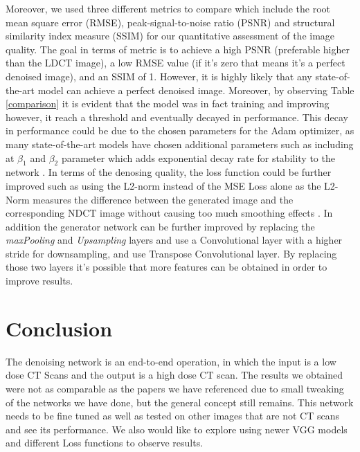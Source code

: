 \documentclass[journal]{IEEEtran}
\begin{document}
Moreover, we used three different metrics to compare which include the root mean square error (RMSE), peak-signal-to-noise ratio (PSNR) and structural similarity index measure (SSIM) for our quantitative assessment of the image quality.  The goal in terms of metric is to achieve a high PSNR (preferable higher than the LDCT image), a low RMSE value (if it's zero that means it's a perfect denoised image), and an SSIM of 1.  However, it is highly likely that any state-of-the-art model can achieve a perfect denoised image.  Moreover, by observing Table \ref{comparison} it is evident that the model was in fact training and improving however, it reach a threshold and eventually decayed in performance.  This decay in performance could be due to the chosen parameters for the Adam optimizer, as many state-of-the-art models have chosen additional parameters such as including at $\beta_1$ and $\beta_2$ parameter which adds exponential decay rate for stability to the network \cite{radford2015unsupervised}.  In terms of the denosing quality, the loss function could be further improved such as using the L2-norm instead of the MSE Loss alone as the L2-Norm measures the difference between the generated image and the corresponding NDCT image without causing too much smoothing effects \cite{yin2021unpaired}.  In addition the generator network can be further improved by replacing the \emph{maxPooling} and \emph{Upsampling} layers and use a Convolutional layer with a higher stride for downsampling, and use Transpose Convolutional layer.  By replacing those two layers it's possible that more features can be obtained in order to improve results. 

\section{Conclusion}
\label{conclusion}
The denoising network is an end-to-end operation, in which the input is a low dose CT Scans and the output is a high dose CT scan.  The results we obtained were not as comparable as the papers we have referenced due to small tweaking of the networks we have done, but the general concept still remains.  This network needs to be fine tuned as well as tested on other images that are not CT scans and see its performance.  We also would like to explore using newer VGG models and different Loss functions to observe results.  



\end{document}
